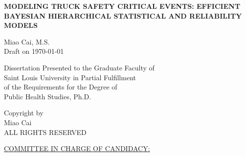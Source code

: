 \documentclass[12pt]{book}
\numberwithin{equation}{chapter}
\newenvironment{bottompar}{\par\vspace*{\fill}}{\clearpage}%
\begin{document}
\begin{titlepage}
\vspace{1cm}
\begin{center}
\linespread{2}\normalsize \bfseries \MakeUppercase{Modeling Truck Safety Critical Events: Efficient Bayesian Hierarchical Statistical and Reliability Models}
\end{center}

\vspace{7cm}

\begin{center}
{Miao Cai,  M.S.}\\
\vspace{0.3cm}
Draft on \today
\end{center}

\vspace{8cm}

\singlespacing
\begin{bottompar}
\begin{center}
Dissertation Presented to the Graduate Faculty of \\
Saint Louis University in Partial Fulfillment \\
of the Requirements for the Degree of\\
Public Health Studies, Ph.D.\\
\vspace{.5cm}
\the\year
\end{center}
\end{bottompar}

\linespread{2}
\end{titlepage}


\cleardoublepage
{}
\begin{bottompar}
\begin{center}
\textcopyright \xspace Copyright by\\
Miao Cai \\
ALL RIGHTS RESERVED\\
\vspace{.5cm}
\the\year
\end{center}
\end{bottompar}


\cleardoublepage
{}
\vspace*{\fill}
\underline{COMMITTEE IN CHARGE OF CANDIDACY:}
\end{document}

